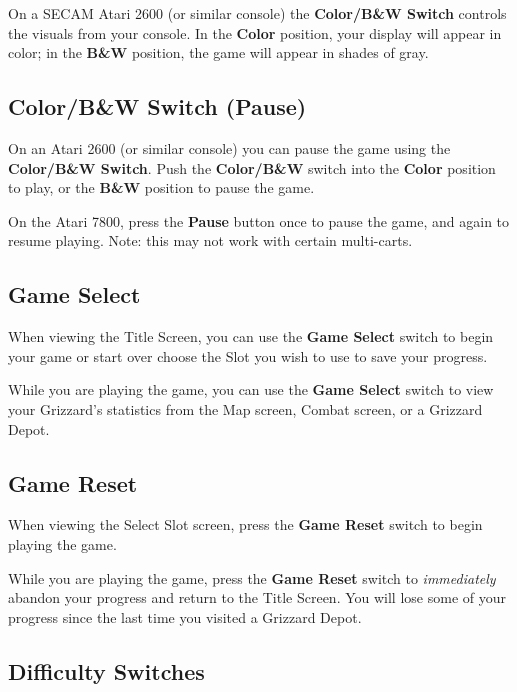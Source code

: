 \documentclass[10pt,twocolumn,openany,article]{memoir}
\begin{document}
On  a  SECAM Atari  2600  (or  similar console)  the  \textbf{Color/B\&W
  Switch} controls the visuals from  your console. In the \textbf{Color}
position,  your  display will  appear  in  color; in  the  \textbf{B\&W}
position, the game will appear in shades of gray.

\else

\subsection{Color/B\&W Switch (Pause)}

On an Atari 2600  (or similar console) you can pause  the game using the
\textbf{Color/B\&W Switch}. Push the \textbf{Color/B\&W} switch into the
\textbf{Color} position to play, or  the \textbf{B\&W} position to pause
the game.

On the  Atari 7800, press  the \textbf{Pause}  button once to  pause the
game, and  again to  resume playing.  \ifdefined\ATARIAGESAVE\else Note:
this may not work with certain multi-carts. \fi

\fi

\subsection{Game Select}

When  viewing the  Title Screen,  you can  use the  \textbf{Game Select}
switch to
\ifdefined\NOSAVE
begin your game or start over
\else
choose the Slot you wish to use to save your progress.
\fi

While you  are playing the  game, you  can use the  \textbf{Game Select}
switch to view your Grizzard's  statistics from the Map screen, Combat
screen, or a Grizzard Depot.

\subsection{Game Reset}

When  viewing the  Select  Slot screen,  press  the \textbf{Game  Reset}
switch to begin playing the game.

While you are playing the game,  press the \textbf{Game Reset} switch to
\emph{immediately} abandon your progress and return to the Title Screen.
You will  lose some  of your  progress since the  last time  you visited
a Grizzard Depot.

\subsection{Difficulty Switches}
\end{document}
